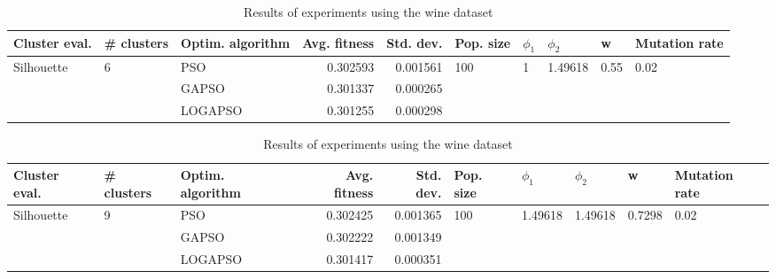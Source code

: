 \documentclass{article}
\begin{document}
\begin{table}
\centering
\caption{Results of experiments using the wine dataset}
\begin{tabular}{lllrrlllll}
\toprule
              Cluster eval. &        \# clusters & Optim. algorithm &  Avg. fitness &  Std. dev. &            Pop. size &         $\phi_{1}$ &               $\phi_{2}$ &                     w &         Mutation rate \\
\midrule
\multirow{3}{*}{Silhouette} & \multirow{3}{*}{6} &              PSO &      0.302593 &   0.001561 & \multirow{3}{*}{100} & \multirow{3}{*}{1} & \multirow{3}{*}{1.49618} & \multirow{3}{*}{0.55} & \multirow{3}{*}{0.02} \\
                            &                    &            GAPSO &      0.301337 &   0.000265 &                      &                    &                          &                       &                       \\
                            &                    &          LOGAPSO &      0.301255 &   0.000298 &                      &                    &                          &                       &                       \\
\bottomrule
\end{tabular}
\end{table}
\begin{table}
\centering
\caption{Results of experiments using the wine dataset}
\begin{tabular}{lllrrlllll}
\toprule
              Cluster eval. &        \# clusters & Optim. algorithm &  Avg. fitness &  Std. dev. &            Pop. size &               $\phi_{1}$ &               $\phi_{2}$ &                       w &         Mutation rate \\
\midrule
\multirow{3}{*}{Silhouette} & \multirow{3}{*}{9} &              PSO &      0.302425 &   0.001365 & \multirow{3}{*}{100} & \multirow{3}{*}{1.49618} & \multirow{3}{*}{1.49618} & \multirow{3}{*}{0.7298} & \multirow{3}{*}{0.02} \\
                            &                    &            GAPSO &      0.302222 &   0.001349 &                      &                          &                          &                         &                       \\
                            &                    &          LOGAPSO &      0.301417 &   0.000351 &                      &                          &                          &                         &                       \\
\bottomrule
\end{tabular}
\end{table}
\end{document}
